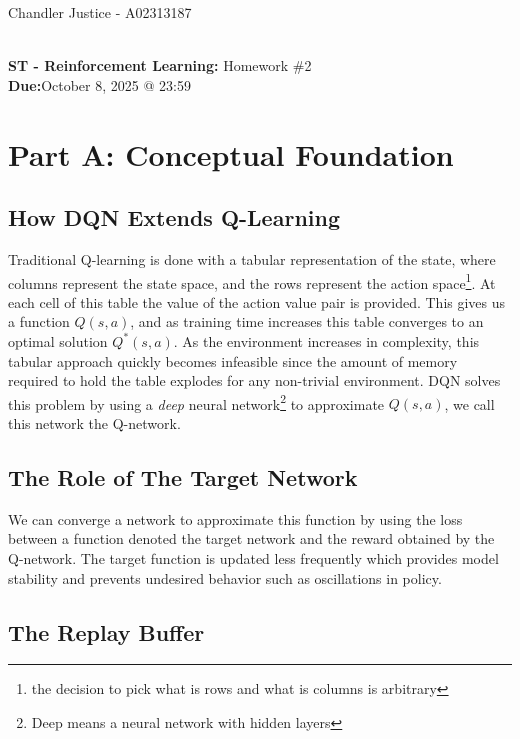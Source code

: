 \documentclass[10pt]{article}
\begin{document}
\begin{flushright}
Chandler Justice - A02313187
\end{flushright}
\noindent \underline{\hspace{3in}}\\
\textbf{ST - Reinforcement Learning:} Homework \#2\\
\textbf{Due:}October 8, 2025 @ 23:59\\

\section{Part A: Conceptual Foundation}

\subsection{How DQN Extends Q-Learning}

Traditional Q-learning is done with a tabular representation of the state, where columns represent the state space, and the rows represent the action space\footnote{the decision to pick what is rows and what is columns is arbitrary}. At each cell of this table the value of the action value pair is provided. This gives us a function $Q(s,a)$, and as training time increases this table converges to an optimal solution $Q^*(s,a)$. As the environment increases in complexity, this tabular approach quickly becomes infeasible since the amount of memory required to hold the table explodes for any non-trivial environment. DQN solves this problem by using a \textit{deep} neural network\footnote{Deep means a neural network with hidden layers} to approximate $Q(s,a)$, we call this network the Q-network. 

\subsection{The Role of The Target Network}

We can converge a network to approximate this function by using the loss between a function denoted the target network and the reward obtained by the Q-network. The target function is updated less frequently which provides model stability and prevents undesired behavior such as oscillations in policy.\\

\subsection{The Replay Buffer}
\end{document}
